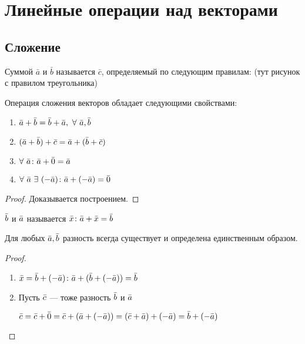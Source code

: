\chapter{Линейные операции над векторами}
\section{Сложение}
\begin{opred}
Суммой $\bar{a}$ и $\bar{b}$ называется $\bar{c}$, определяемый по следующим правилам: (тут рисунок с правилом треугольника)
\end{opred}
\begin{theor}
Операция сложения векторов обладает следующими свойствами: \begin{enumerate}
\item $\va+\vb=\vb+\va,\ \forall\ \va,\vb$
\item $(\bar{a}+\bar{b})+\bar{c}=\bar{a}+(\bar{b}+\bar{c})$
\item $\forall\ \va\colon\va+\vo=\va$
\item $\forall\ \va\ \exists\ (-\va)\colon\va+(-\va)=\vo$
\end{enumerate}
\end{theor}
\begin{proof}
Доказывается построением.
\end{proof}
\begin{opred}
 $\bar{b}$ и $\bar{a}$ называется $\bar{x}\colon\bar{a}+\bar{x}=\bar{b}$
\end{opred}
\begin{remark}
Для любых $\bar{a},\bar{b}$ разность всегда существует и определена единственным образом.
\end{remark}
\begin{proof}\begin{enumerate}
\item $\bar{x}=\bar{b}+(-\bar{a})\colon\bar{a}+(\bar{b}+(-\bar{a}))=\bar{b}$
\item Пусть $\bar{c}$ --- тоже разность $\bar{b}$ и $\bar{a}$

$\bar{c}=\bar{c}+\bar{0}=\bar{c}+(\bar{a}+(-\bar{a}))=(\bar{c}+\bar{a})+(-\bar{a})=\bar{b}+(-\bar{a})$
\end{enumerate}\end{proof}
